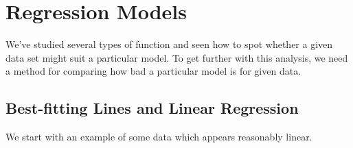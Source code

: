 \graphicspath{{5regression/asy/}}

\section{Regression Models}

We've studied several types of function and seen how to spot whether a given data set might suit a particular model. To get further with this analysis, we need a method for comparing how bad a particular model is for given data.

\subsection{Best-fitting Lines and Linear Regression}

We start with an example of some data which appears reasonably linear.

